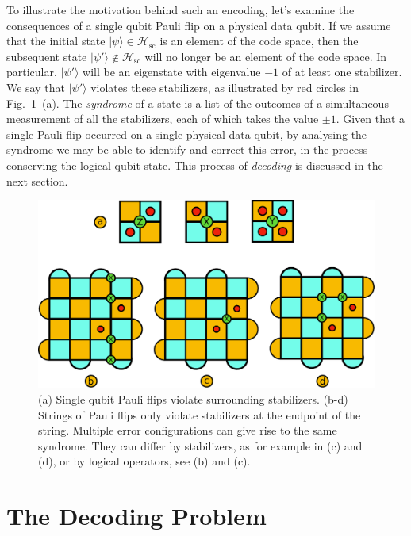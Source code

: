 \documentclass[twocolumn,preprintnumbers,amsmath,amssymb,notitlepage,nofootinbib,longbibliography,superscriptaddress,aps,pra,10pt]{revtex4-1}
\begin{document}
	To illustrate the motivation behind such an encoding, let's examine the consequences of a single qubit Pauli flip on a physical data qubit.
	If we assume that the initial state $|\psi\rangle \in \mathcal{H}_\mathrm{sc}$ is an element of the code space, then the subsequent state $|\psi'\rangle \not \in \mathcal{H}_\mathrm{sc}$ will no longer be an element of the code space.
	In particular, $|\psi'\rangle$ will be an eigenstate with eigenvalue $-1$ of at least one stabilizer.
	We say that $|\psi'\rangle$ violates these stabilizers, as illustrated by red circles in Fig.~\ref{f:surface_code_examples}~(a).
	The \textit{syndrome} of a state is a list of the outcomes of a simultaneous measurement of all the stabilizers, each of which takes the value $\pm 1$.
	Given that a single Pauli flip occurred on a single physical data qubit, by analysing the syndrome we may be able to identify and correct this error, in the process conserving the logical qubit state. 
	This process of \textit{decoding} is discussed in the next section.

	\begin{figure}
		\centering
		\includegraphics[width=1\linewidth]{figures/surface_code_examples.pdf}
		\caption{
			(a) Single qubit Pauli flips violate surrounding stabilizers.
			(b-d) Strings of Pauli flips only violate stabilizers at the endpoint of the string.
			Multiple error configurations can give rise to the same syndrome.
			They can differ by stabilizers, as for example in (c) and (d), or by logical operators, see (b) and (c).
		}
		\label{f:surface_code_examples}
	\end{figure}

\section{The Decoding Problem}\label{s:the_decoding_problem}
\end{document}
